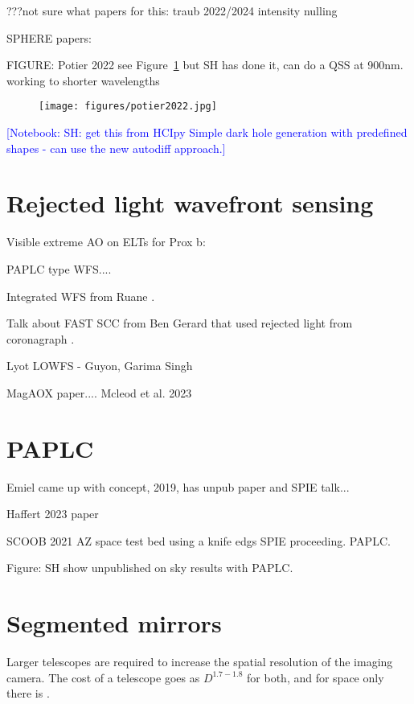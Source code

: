 \documentclass[letterpaper]{ar-1col}
\newcommand{\notebooksuggestion}[1]{\textcolor{blue}{[Notebook: #1]}}
\begin{document}
???not sure what papers for this: traub 2022/2024 intensity nulling

SPHERE papers:


FIGURE: Potier 2022 see Figure~\ref{fig:fpwfsclean} but SH has done it, can do a QSS at 900nm. working to shorter wavelengths

\begin{figure}[ht]
  \centering
  \texttt{[image: figures/potier2022.jpg]}
  \caption{}
  \label{fig:fpwfsclean}
\end{figure}

\notebooksuggestion{SH: get this from HCIpy Simple dark hole generation with predefined shapes - can use the new autodiff approach.}

\lipsum[2-4]

\section{Rejected light wavefront sensing} 

Visible extreme AO on ELTs for Prox b: \citep{Fowler23}

PAPLC type WFS....

Integrated WFS from Ruane \citep{Ruane20}.

Talk about FAST SCC from Ben Gerard that used rejected light from coronagraph \citep{Gerard18}.

Lyot LOWFS - Guyon, Garima Singh

MagAOX paper.... Mcleod et al. 2023

\lipsum[2-4]

\section{PAPLC}

Emiel came up with concept, 2019, has unpub paper and SPIE talk...

Haffert 2023 paper

SCOOB 2021 AZ space test bed using a knife edgs SPIE proceeding. PAPLC.

Figure: SH show unpublished on sky results with PAPLC.

\lipsum[2-4]

\section{Segmented mirrors}
\lipsum[2-4]

Larger telescopes are required to increase the spatial resolution of the imaging camera. The cost of a telescope goes as $D^{1.7-1.8}$ \citep{Stahl20} for both, and for space only there is \citet{Stahl10}.
 
\end{document}
